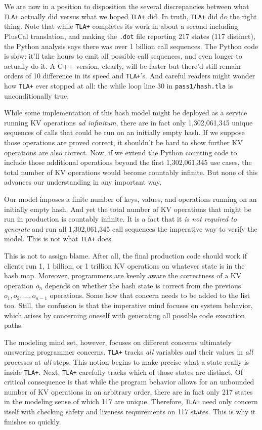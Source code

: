 \documentclass[twocolumn]{article}
\begin{document}
We are now in a position to disposition the several discrepancies between what \texttt{TLA+} actually did versus what we hoped \texttt{TLA+} did. In truth, \texttt{TLA+} did do the right thing. Note that while \texttt{TLA+} completes its work in about a second including PlusCal translation, and making the \texttt{.dot} file reporting 217 states (117 distinct), the Python analysis says there was over 1 billion call sequences. The Python code is slow: it'll take hours to emit all possible call sequences, and even longer to actually do it. A C++ version, clearly, will be faster but there'd still remain orders of 10 difference in its speed and \texttt{TLA+}'s. And careful readers might wonder how \texttt{TLA+} ever stopped at all: the while loop line 30 in \texttt{pass1/hash.tla} is unconditionally true.

While some implementation of this hash model might be deployed as a service running KV operations \emph{ad infinitum}, there are in fact only 1,302,061,345 unique sequences of calls that could be run on an initially empty hash. If we suppose those operations are proved correct, it shouldn't be hard to show further KV operations are also correct. Now, if we extend the Python counting code to include those additional operations beyond the first 1,302,061,345 use cases, the total number of KV operations would become countably infinite. But none of this advances our understanding in any important way.

Our model imposes a finite number of keys, values, and operations running on an initially empty hash. And yet the total number of KV operations that might be run in production is countably infinite. It is a fact that it \emph{is not required to generate} and run all 1,302,061,345 call sequences the imperative way to verify the model. This is not what \texttt{TLA+} does. 

This is not to assign blame. After all, the final production code should work if clients run 1, 1 billion, or 1 trillion KV operations on whatever state is in the hash map. Moreover, programmers are keenly aware the correctness of a KV operation $o_n$ depends on whether the hash state is correct from the previous $o_1,o_2,\ldots,o_{n-1}$ operations. Some how that concern needs to be added to the list too. Still, the confusion is that the imperative mind focuses on system behavior, which arises by concerning oneself with generating all possible code execution paths. 

The modeling mind set, however, focuses on different concerns ultimately answering programmer concerns. \texttt{TLA+} tracks \emph{all} variables and their values in \emph{all} processes at \emph{all} steps. This notion begins to make precise what a state really is inside \texttt{TLA+}. Next, \texttt{TLA+} carefully tracks which of those states are distinct. Of critical consequence is that while the program behavior allows for an unbounded number of KV operations in an arbitrary order, there are in fact only 217 states in the modeling sense of which 117 are unique. Therefore, \texttt{TLA+} need only concern itself with checking safety and liveness requirements on 117 states. This is why it finishes so quickly.
\end{document}
